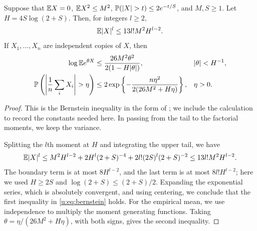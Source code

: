 \begin{lemma}\label{u:lem:bernstein}
Suppose that $\mathbb E X=0$, $\mathbb E X^2\le M^2$,
$\PP(|X|>t)\le2e^{-t/S}$, and $M,S\ge1$.
Let $H=4S\log(2+S)$. Then, for integers $l\ge2$,
\begin{equation}\label{u:eq:bernstein-moments}
 \mathbb E|X|^l\le13l!M^2H^{l-2}.
\end{equation}
If $X_1,\ldots,X_n$ are independent copies of $X$, then
\begin{equation}\label{u:eq:bernstein}
\begin{aligned}
 \log\E e^{\theta X}
 &\le\frac{26M^2\theta^2}{2(1-H|\theta|)},
 &&|\theta|<H^{-1},\\
 \PP\left(\left|\frac1n\sum_iX_i\right|>\eta\right)
 &\le2\exp\left\{-\frac{n\eta^2}{2(26M^2+H\eta)}\right\},
 &&\eta>0.
\end{aligned}
\end{equation}
\end{lemma}

\begin{proof}
This is the Bernstein inequality in the form of
\cite[Theorem~2.10 and Corollary~2.11]{boucheron-lugosi-massart-2013}; we include the
calculation to record the constants needed here. In passing from the
tail to the factorial moments, we keep the variance.

Splitting the $l$th moment at $H$ and integrating the upper tail, we have
\[
 \mathbb E|X|^l
 \le M^2H^{l-2}+2H^l(2+S)^{-4}
       +2l!(2S)^l(2+S)^{-2}
 \le13l!M^2H^{l-2}.
\]
The boundary term is at most $8H^{l-2}$, and the last term is at most
$8l!H^{l-2}$; here we used $H\ge2S$ and
$\log(2+S)\le(2+S)/2$. Expanding the exponential series, which is
absolutely convergent, and using centering, we conclude that the first
inequality in \eqref{u:eq:bernstein} holds. For the empirical mean, we use independence
to multiply the moment generating functions.
Taking $\theta=\eta/(26M^2+H\eta)$, with both
signs, gives the second inequality.
\end{proof}

